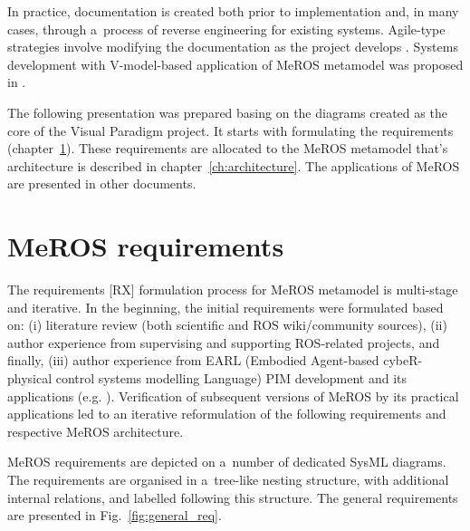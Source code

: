 \documentclass[11pt,oneside,a4paper]{report}
\begin{document}
	In practice, documentation is created both prior to implementation and, in many cases, through a~process of reverse  engineering \cite{canfora2007new} for existing systems. Agile-type strategies involve modifying the documentation as the project develops \cite{habib2021systematic}. Systems development with V-model-based application of MeROS metamodel was proposed in \cite{winiarski2025-v-model}.
			
	The following presentation was prepared basing on the diagrams created as the core of the Visual Paradigm project. It starts with formulating the requirements (chapter~\ref{ch:requirements}). These requirements are allocated to the MeROS metamodel that's architecture is described in chapter~\ref{ch:architecture}. The applications of MeROS are presented in other documents.
	
	
\chapter{MeROS requirements}
\label{ch:requirements}
	The requirements [RX] formulation process for MeROS metamodel is multi-stage and iterative. In the beginning, the initial requirements were formulated based on: (i) literature review (both scientific and ROS wiki/community sources), (ii) author experience from supervising and supporting ROS-related projects, and finally, (iii) author experience from EARL (Embodied Agent-based cybeR-physical control systems modelling Language) \cite{earl2020} PIM development and its applications (e.g. \cite{tasker2020,karwowski2021hubero,en14206693-grav-comp}). Verification of subsequent versions of MeROS by its practical applications led to an iterative reformulation of the following requirements and respective MeROS architecture.
	
	MeROS requirements are depicted on a~number of dedicated SysML diagrams. The requirements are organised in a~tree-like nesting structure, with additional internal relations, and labelled following this structure. The general requirements are presented in Fig.~\ref{fig:general_req}. 
		
\end{document}
